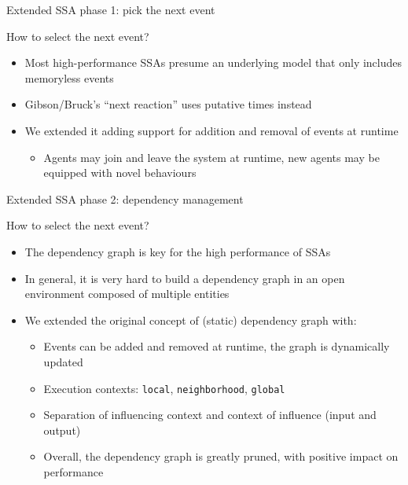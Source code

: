 \documentclass[presentation]{beamer} %
\begin{document}
\begin{frame}{Extended SSA phase 1: pick the next event}
  \begin{block}{How to select the next event?}
    \begin{itemize}
      \item Most high-performance SSAs presume an underlying model that only includes memoryless events \cite{slepoy2008}
      \item Gibson/Bruck's ``next reaction'' uses putative times instead
      \item We extended it adding support for addition and removal of events at runtime
      \begin{itemize}
        \item Agents may join and leave the system at runtime, new agents may be equipped with novel behaviours
      \end{itemize}
    \end{itemize}
  \end{block}
\end{frame}

\begin{frame}{Extended SSA phase 2: dependency management}
  \begin{block}{How to select the next event?}
    \begin{itemize}
      \item The dependency graph is key for the high performance of SSAs \cite{slepoy2008}
      \item In general, it is very hard to build a dependency graph in an open environment composed of multiple entities
      \item We extended the original concept of (static) dependency graph with:
      \begin{itemize}
        \item Events can be added and removed at runtime, the graph is dynamically updated
        \item Execution contexts: \texttt{local}, \texttt{neighborhood}, \texttt{global}
        \item Separation of influencing context and context of influence (input and output)
        \item Overall, the dependency graph is greatly pruned, with positive impact on performance
      \end{itemize}
    \end{itemize}
  \end{block}
\end{frame}
\end{document}
